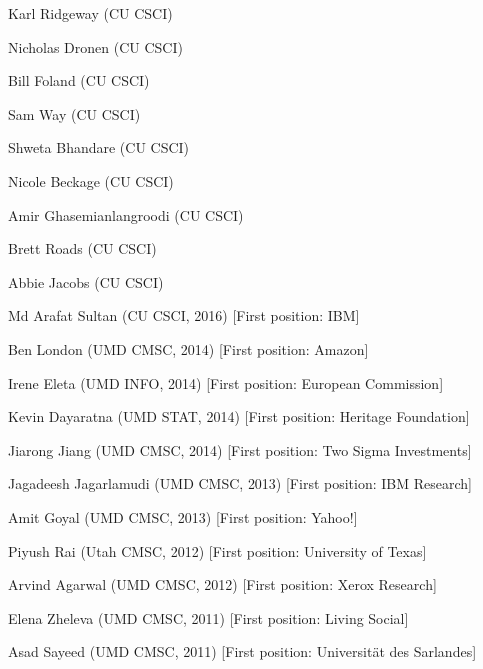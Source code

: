 {{\begin{enumerate*}
\item Karl Ridgeway (CU CSCI)
\item Nicholas Dronen (CU CSCI)
\item Bill Foland (CU CSCI)
\item Sam Way (CU CSCI)
\item Shweta Bhandare (CU CSCI)
\item Nicole Beckage (CU CSCI)
\item Amir Ghasemianlangroodi (CU CSCI)
\item Brett Roads (CU CSCI)
\item Abbie Jacobs (CU CSCI)
\item Md Arafat Sultan (CU CSCI, 2016) [First position: IBM]
\item Ben London (UMD CMSC, 2014) [First position: Amazon]
\item Irene Eleta (UMD INFO, 2014) [First position: European Commission]
\item Kevin Dayaratna (UMD STAT, 2014) [First position: Heritage Foundation]
\item Jiarong Jiang (UMD CMSC, 2014) [First position: Two Sigma Investments]
\item Jagadeesh Jagarlamudi (UMD CMSC, 2013) [First position: IBM Research]
\item Amit Goyal (UMD CMSC, 2013) [First position: Yahoo!]
\item Piyush Rai (Utah CMSC, 2012) [First position: University of Texas]
\item Arvind Agarwal (UMD CMSC, 2012) [First position: Xerox Research]
\item Elena Zheleva (UMD CMSC, 2011) [First position: Living Social]
\item Asad Sayeed (UMD CMSC, 2011) [First position: Universit\"at des Sarlandes]
\end{enumerate*}
}
}




